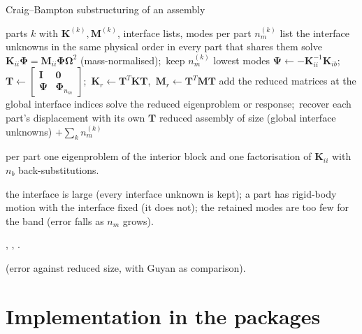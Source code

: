 
\begin{algbox}{Craig--Bampton substructuring of an assembly}
\begin{pseudo}
\Require parts $k$ with $\bm K^{(k)},\bm M^{(k)}$, interface lists, modes per part $n_m^{(k)}$
\State list the interface unknowns in the same physical order in every part that shares them
  \State solve $\bm K_{ii}\bm\Phi=\bm M_{ii}\bm\Phi\bm\Omega^2$ (mass-normalised);\ keep $n_m^{(k)}$ lowest modes
  \State $\bm\Psi\gets-\bm K_{ii}^{-1}\bm K_{ib}$;\ $\bm T\gets\begin{bmatrix}\bm I&\bm0\\\bm\Psi&\bm\Phi_{n_m}\end{bmatrix}$;\ $\bm K_r\gets\bm T^T\bm K\bm T$,\ $\bm M_r\gets\bm T^T\bm M\bm T$
\EndFor
\State add the reduced matrices at the global interface indices 
\State solve the reduced eigenproblem or response;\ recover each part's displacement with its own $\bm T$
\Ensure reduced assembly of size (global interface unknowns) $+\sum_kn_m^{(k)}$
\end{pseudo}
\begin{algdet}
\item[Cost] per part one eigenproblem of the interior block and one factorisation of $\bm K_{ii}$ with $n_b$ back-substitutions.
\item[Fails when] the interface is large (every interface unknown is kept); a part has rigid-body motion with the interface fixed (it does not); the retained modes are too few for the band (error falls as $n_m$ grows).
\item[Code] , , .
\item[Verified in]  (error against reduced size, with Guyan as comparison).
\end{algdet}
\end{algbox}

\section{Implementation in the packages}\label{sec:cm-impl}

